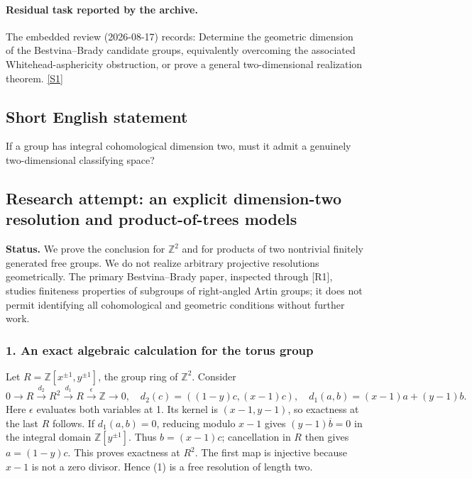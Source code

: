 \documentclass[11pt,a4paper]{article}
\newcommand{\sref}[2]{\hyperlink{source:#1:#2}{[S#2]}}
\begin{document}
\paragraph{Residual task reported by the archive.}

The embedded review (2026-08-17) records: Determine the geometric dimension of the Bestvina--Brady candidate groups, equivalently overcoming the associated Whitehead-asphericity obstruction, or prove a general two-dimensional realization theorem. \sref{1451}{1}

\subsection{Short English statement}

If a group has integral cohomological dimension two, must it admit a genuinely two-dimensional classifying space?

\subsection{Research attempt: an explicit dimension-two resolution and product-of-trees models}
\textbf{Status.} We prove the conclusion for $\mathbb Z^2$ and for products of two nontrivial finitely generated free groups. We do not realize arbitrary projective resolutions geometrically. The primary Bestvina--Brady paper, inspected through [R1], studies finiteness properties of subgroups of right-angled Artin groups; it does not permit identifying all cohomological and geometric conditions without further work.

\subsubsection{1. An exact algebraic calculation for the torus group}
Let $R=\mathbb Z[x^{\pm1},y^{\pm1}]$, the group ring of $\mathbb Z^2$. Consider
\[0\longrightarrow R\xrightarrow{d_2}R^2\xrightarrow{d_1}R
\xrightarrow{\epsilon}\mathbb Z\longrightarrow0,
\quad d_2(c)=((1-y)c,(x-1)c),\quad
d_1(a,b)=(x-1)a+(y-1)b.\tag{1}\]
Here $\epsilon$ evaluates both variables at 1. Its kernel is $(x-1,y-1)$, so exactness at the last $R$ follows. If $d_1(a,b)=0$, reducing modulo $x-1$ gives $(y-1)\overline b=0$ in the integral domain $\mathbb Z[y^{\pm1}]$. Thus $b=(x-1)c$; cancellation in $R$ then gives $a=(1-y)c$. This proves exactness at $R^2$. The first map is injective because $x-1$ is not a zero divisor. Hence (1) is a free resolution of length two.
\end{document}
